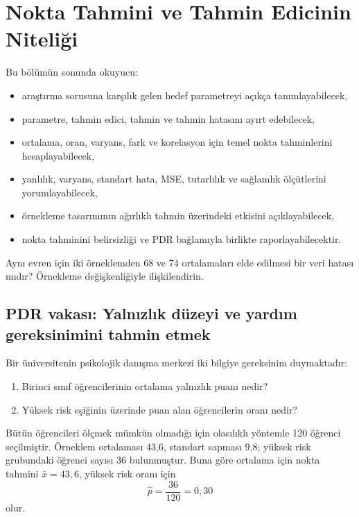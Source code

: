 \chapter{Nokta Tahmini ve Tahmin Edicinin Niteliği}
\label{ch:point-estimation}

\begin{hedefler}
Bu bölümün sonunda okuyucu:
\begin{itemize}
  \item araştırma sorusuna karşılık gelen hedef parametreyi açıkça tanımlayabilecek,
  \item parametre, tahmin edici, tahmin ve tahmin hatasını ayırt edebilecek,
  \item ortalama, oran, varyans, fark ve korelasyon için temel nokta tahminlerini hesaplayabilecek,
  \item yanlılık, varyans, standart hata, MSE, tutarlılık ve sağlamlık ölçütlerini yorumlayabilecek,
  \item örnekleme tasarımının ağırlıklı tahmin üzerindeki etkisini açıklayabilecek,
  \item nokta tahminini belirsizliği ve PDR bağlamıyla birlikte raporlayabilecektir.
\end{itemize}
\end{hedefler}

\begin{hazirlik}
Aynı evren için iki örneklemden 68 ve 74 ortalamaları elde edilmesi bir veri
hatası mıdır? Örnekleme değişkenliğiyle ilişkilendirin.
\end{hazirlik}

\section{PDR vakası: Yalnızlık düzeyi ve yardım gereksinimini tahmin etmek}

Bir üniversitenin psikolojik danışma merkezi iki bilgiye gereksinim duymaktadır:

\begin{enumerate}
  \item Birinci sınıf öğrencilerinin ortalama yalnızlık puanı nedir?
  \item Yüksek risk eşiğinin üzerinde puan alan öğrencilerin oranı nedir?
\end{enumerate}


Bütün öğrencileri ölçmek mümkün olmadığı için olasılıklı yöntemle 120 öğrenci
seçilmiştir. Örneklem ortalaması 43,6, standart sapması 9,8; yüksek risk
grubundaki öğrenci sayısı 36 bulunmuştur. Buna göre ortalama için nokta tahmini
$\bar{x}=43{,}6$, yüksek risk oranı için
\[
\hat p=\frac{36}{120}=0{,}30
\]
olur.

